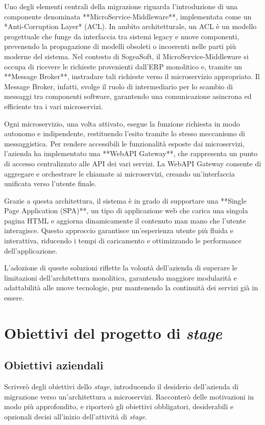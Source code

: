         Uno degli elementi centrali della migrazione riguarda l'introduzione di una componente denominata **MicroService-Middleware**, implementata come un *Anti-Corruption Layer* (ACL). In ambito architetturale, un ACL è un modello progettuale che funge da interfaccia tra sistemi legacy e nuove componenti, prevenendo la propagazione di modelli obsoleti o incoerenti nelle parti più moderne del sistema. Nel contesto di SogeaSoft, il MicroService-Middleware si occupa di ricevere le richieste provenienti dall'ERP monolitico e, tramite un **Message Broker**, instradare tali richieste verso il microservizio appropriato. Il Message Broker, infatti, svolge il ruolo di intermediario per lo scambio di messaggi tra componenti software, garantendo una comunicazione asincrona ed efficiente tra i vari microservizi.  

        Ogni microservizio, una volta attivato, esegue la funzione richiesta in modo autonomo e indipendente, restituendo l’esito tramite lo stesso meccanismo di messaggistica. Per rendere accessibili le funzionalità esposte dai microservizi, l'azienda ha implementato una **WebAPI Gateway**, che rappresenta un punto di accesso centralizzato alle API dei vari servizi. La WebAPI Gateway consente di aggregare e orchestrare le chiamate ai microservizi, creando un'interfaccia unificata verso l'utente finale.  

        Grazie a questa architettura, il sistema è in grado di supportare una **Single Page Application (SPA)**, un tipo di applicazione web che carica una singola pagina HTML e aggiorna dinamicamente il contenuto man mano che l'utente interagisce. Questo approccio garantisce un'esperienza utente più fluida e interattiva, riducendo i tempi di caricamento e ottimizzando le performance dell'applicazione.  

        L'adozione di queste soluzioni riflette la volontà dell'azienda di superare le limitazioni dell'architettura monolitica, garantendo maggiore modularità e adattabilità alle nuove tecnologie, pur mantenendo la continuità dei servizi già in essere.
        
        
    \section{Obiettivi del progetto di \textit{stage}}
        \subsection{Obiettivi aziendali}
        Scriverò degli obiettivi dello \textit{stage}, introducendo il desiderio dell'azienda di migrazione verso un'architettura a microservizi. Racconterò delle motivazioni in modo più approfondito, e riporterò gli obiettivi obbligatori, desiderabili e opzionali decisi all'inizio dell'attività di \textit{stage}.
